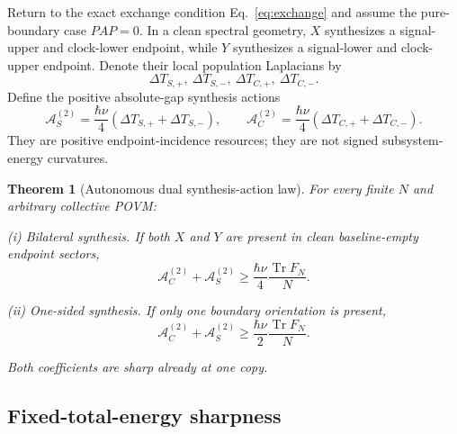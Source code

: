 \documentclass[aps,pra,preprint,nofootinbib]{revtex4-2}
\newtheorem{theorem}{Theorem}
\newcommand{\Tr}{\operatorname{Tr}}
\newcommand{\Fcl}{F}
\newcommand{\Aact}{\mathcal A}
\begin{document}
Return to the exact exchange condition Eq.~\eqref{eq:exchange} and assume the pure-boundary case $PAP=0$.  In a clean spectral geometry, $X$ synthesizes a signal-upper and clock-lower endpoint, while $Y$ synthesizes a signal-lower and clock-upper endpoint.  Denote their local population Laplacians by
\begin{equation}
\Delta T_{S,+},\ \Delta T_{S,-},\ \Delta T_{C,+},\ \Delta T_{C,-}.
\end{equation}
Define the positive absolute-gap synthesis actions
\begin{equation}
\Aact_S^{(2)}=\frac{\hbar\nu}{4}(\Delta T_{S,+}+\Delta T_{S,-}),
\qquad
\Aact_C^{(2)}=\frac{\hbar\nu}{4}(\Delta T_{C,+}+\Delta T_{C,-}).
\label{eq:local-actions}
\end{equation}
They are positive endpoint-incidence resources; they are not signed subsystem-energy curvatures.

\begin{theorem}[Autonomous dual synthesis-action law]
\label{thm:dual-action}
For every finite $N$ and arbitrary collective POVM:

\emph{(i) Bilateral synthesis.} If both $X$ and $Y$ are present in clean baseline-empty endpoint sectors,
\begin{equation}
\boxed{
\Aact_C^{(2)}+\Aact_S^{(2)}
\ge
\frac{\hbar\nu}{4}\frac{\Tr \Fcl_N}{N}.
}
\label{eq:dual-action-bilateral}
\end{equation}

\emph{(ii) One-sided synthesis.} If only one boundary orientation is present,
\begin{equation}
\boxed{
\Aact_C^{(2)}+\Aact_S^{(2)}
\ge
\frac{\hbar\nu}{2}\frac{\Tr \Fcl_N}{N}.
}
\label{eq:dual-action-one-sided}
\end{equation}

Both coefficients are sharp already at one copy.
\end{theorem}

\subsection{Fixed-total-energy sharpness}
\end{document}
